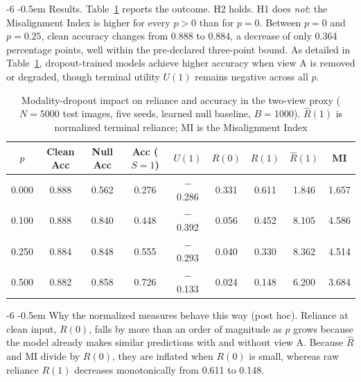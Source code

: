 \documentclass[graybox]{svmult}
\makeatletter
\newcommand{\checknum}[2]{#1}
\renewcommand\paragraph{\@startsection{paragraph}{4}{\z@}%
  {-6\p@ \@plus -2\p@ \@minus -2\p@}%
  {-0.5em}%
  {\normalfont\normalsize\bfseries}}
\makeatother
\begin{document}
\paragraph{Results.}
Table~\ref{tab:fusion} reports the outcome. H2 holds. H1 does \emph{not}:
the Misalignment Index is higher for every $p>0$ than for $p=0$. Between
$p=0$ and $p=0.25$, clean accuracy changes from
\checknum{0.888}{fusion:0.0:clean_acc} to
\checknum{0.884}{fusion:0.25:clean_acc}, a decrease of only
\checknum{0.364}{fusion:diff_0_25:clean_acc_pp} percentage points,
well within the pre-declared three-point bound.
As detailed in Table~\ref{tab:fusion}, dropout-trained models achieve higher
accuracy when view A is removed or degraded, though terminal utility $U(1)$
remains negative across all $p$.
\begin{table}[tb]
\centering
\caption{Modality-dropout impact on reliance and accuracy in the
  two-view proxy ($N=5000$ test images, five seeds, learned null
  baseline, $B=1000$). $\hat{R}(1)$ is normalized terminal reliance;
  MI is the Misalignment Index}
\label{tab:fusion}
{\footnotesize\setlength{\tabcolsep}{3pt}%
\begin{tabular}{ccccccccc}
\toprule
$p$ & Clean Acc & Null Acc & Acc ($S=1$) & $U(1)$ & $R(0)$ & $R(1)$ & $\hat{R}(1)$ & MI \\
\midrule
0.000 & 0.888 & 0.562 & 0.276 & $-$0.286 & 0.331 & 0.611 & 1.846 & 1.657 \\
0.100 & 0.888 & 0.840 & 0.448 & $-$0.392 & 0.056 & 0.452 & 8.105 & 4.586 \\
0.250 & 0.884 & 0.848 & 0.555 & $-$0.293 & 0.040 & 0.330 & 8.362 & 4.514 \\
0.500 & 0.882 & 0.858 & 0.726 & $-$0.133 & 0.024 & 0.148 & 6.200 & 3.684 \\
\bottomrule
\end{tabular}}
\end{table}

\paragraph{Why the normalized measures behave this way (post hoc).}
Reliance at clean input, $R(0)$, falls by more than an order of magnitude as $p$ grows because the model already makes similar predictions with and without view A. Because $\hat{R}$ and MI divide by $R(0)$, they are inflated when $R(0)$ is small, whereas raw reliance $R(1)$ decreases monotonically from \checknum{0.611}{fusion:0.0:R_1_raw} to \checknum{0.148}{fusion:0.5:R_1_raw}.
\end{document}
